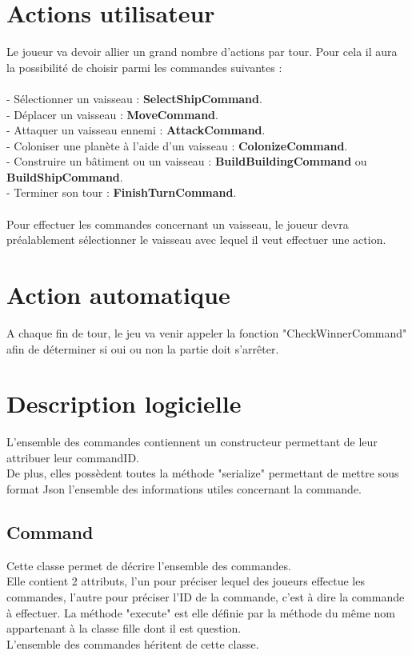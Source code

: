 \section{Actions utilisateur} 

Le joueur va devoir allier un grand nombre d'actions par tour. Pour cela il aura la possibilité de choisir parmi les commandes suivantes : \\ \\
- Sélectionner un vaisseau :  \textbf{SelectShipCommand}. \\
- Déplacer un vaisseau :  \textbf{MoveCommand}.\\
- Attaquer un vaisseau ennemi :  \textbf{AttackCommand}. \\
- Coloniser une planète à l'aide d'un vaisseau :  \textbf{ColonizeCommand}. \\
- Construire un bâtiment ou un vaisseau :  \textbf{BuildBuildingCommand} ou  \textbf{BuildShipCommand}. \\
- Terminer son tour : \textbf{FinishTurnCommand}. \\ \\
Pour effectuer les commandes concernant un vaisseau, le joueur devra préalablement sélectionner le vaisseau avec lequel il veut effectuer une action.

\section{Action automatique}

A chaque fin de tour, le jeu va venir appeler la fonction "CheckWinnerCommand" afin de déterminer si oui ou non la partie doit s'arrêter.

\section{Description logicielle}

L'ensemble des commandes contiennent un constructeur permettant de leur attribuer leur commandID. \\
De plus, elles possèdent toutes la méthode "serialize" permettant de mettre sous format Json l'ensemble des informations utiles concernant la commande.

\subsection{Command}

Cette classe permet de décrire l'ensemble des commandes. \\
Elle contient 2 attributs, l'un pour préciser lequel des joueurs effectue les commandes, l'autre pour préciser l'ID de la commande, c'est à dire la commande à effectuer. La méthode "execute" est elle définie par la méthode du même nom appartenant à la classe fille dont il est question.\\
L'ensemble des commandes héritent de cette classe.\\

